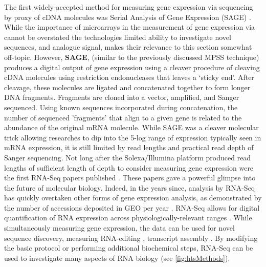 


The first widely-accepted method for measuring gene expression via sequencing by proxy of cDNA molecules was Serial Analysis of Gene Expression (SAGE) \citep{Velculescu1995a}. While the importance of microarrays in the measurement of gene expression via cannot be overstated \citep{Shendure2008,Marioni2008} the technologies limited ability to investigate novel sequences, and analogue signal, makes their relevance to this section somewhat off-topic. However, \textbf{SAGE}, (similar to the previously discussed MPSS technique) produces a digital output of gene expression using a cleaver procedure of cleaving cDNA molecules using restriction endonucleases that leaves a ‘sticky end’. After cleavage, these molecules are ligated and concatenated together to form longer DNA fragments. Fragments are cloned into a vector, amplified, and Sanger sequenced. Using known sequences incorporated during concatenation, the number of sequenced 'fragments' that align to a given gene is related to the abundance of the original mRNA molecule. While SAGE was a cleaver molecular trick allowing researches to dip into the 5-log range of expression typically seen in mRNA expression, it is still limited by read lengths and practical read depth of Sanger sequencing. 
Not long after the Solexa/Illumina platform produced read lengths of sufficient length of depth to consider measuring gene expression were the first RNA-Seq papers published \citep{Mortazavi2008, Nagalakshmi2008,Lister2008}. These papers gave a powerful glimpse into the future of molecular biology. Indeed, in the years since, analysis by RNA-Seq has quickly overtaken other forms of gene expression analysis, as demonstrated by the number of accessions deposited in GEO per year \citep{Barrett2013}. RNA-Seq allows for digital quantification of RNA expression across physiologically-relevant ranges \citep{Blencowe2009}. While simultaneously measuring gene expression, the data can be used for novel sequence discovery, measuring RNA-editing \citep{Li2011}, transcript assembly \citep{Trapnell2010}. By modifying the basic protocol or performing additional biochemical steps, RNA-Seq can be used to investigate many aspects of RNA biology (see \ref{fig:htsMethods}). 


